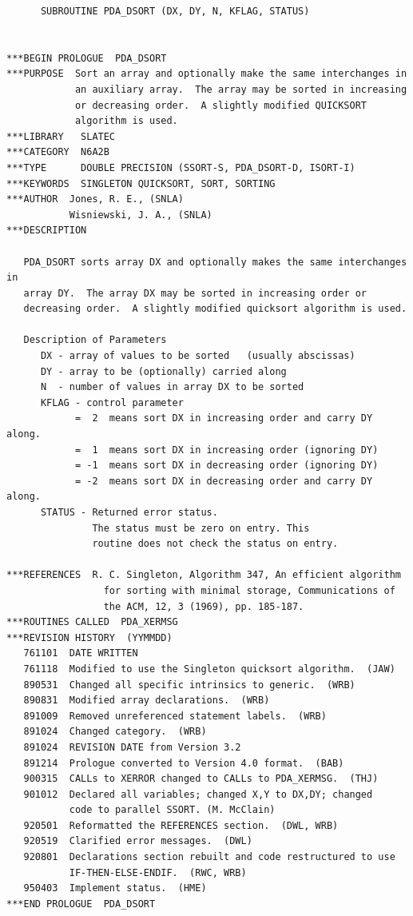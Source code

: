 \documentclass[11pt,twoside]{article}
\begin{document}
\begin{verbatim}
      SUBROUTINE PDA_DSORT (DX, DY, N, KFLAG, STATUS)


***BEGIN PROLOGUE  PDA_DSORT
***PURPOSE  Sort an array and optionally make the same interchanges in
            an auxiliary array.  The array may be sorted in increasing
            or decreasing order.  A slightly modified QUICKSORT
            algorithm is used.
***LIBRARY   SLATEC
***CATEGORY  N6A2B
***TYPE      DOUBLE PRECISION (SSORT-S, PDA_DSORT-D, ISORT-I)
***KEYWORDS  SINGLETON QUICKSORT, SORT, SORTING
***AUTHOR  Jones, R. E., (SNLA)
           Wisniewski, J. A., (SNLA)
***DESCRIPTION

   PDA_DSORT sorts array DX and optionally makes the same interchanges in
   array DY.  The array DX may be sorted in increasing order or
   decreasing order.  A slightly modified quicksort algorithm is used.

   Description of Parameters
      DX - array of values to be sorted   (usually abscissas)
      DY - array to be (optionally) carried along
      N  - number of values in array DX to be sorted
      KFLAG - control parameter
            =  2  means sort DX in increasing order and carry DY along.
            =  1  means sort DX in increasing order (ignoring DY)
            = -1  means sort DX in decreasing order (ignoring DY)
            = -2  means sort DX in decreasing order and carry DY along.
      STATUS - Returned error status.
               The status must be zero on entry. This
               routine does not check the status on entry.

***REFERENCES  R. C. Singleton, Algorithm 347, An efficient algorithm
                 for sorting with minimal storage, Communications of
                 the ACM, 12, 3 (1969), pp. 185-187.
***ROUTINES CALLED  PDA_XERMSG
***REVISION HISTORY  (YYMMDD)
   761101  DATE WRITTEN
   761118  Modified to use the Singleton quicksort algorithm.  (JAW)
   890531  Changed all specific intrinsics to generic.  (WRB)
   890831  Modified array declarations.  (WRB)
   891009  Removed unreferenced statement labels.  (WRB)
   891024  Changed category.  (WRB)
   891024  REVISION DATE from Version 3.2
   891214  Prologue converted to Version 4.0 format.  (BAB)
   900315  CALLs to XERROR changed to CALLs to PDA_XERMSG.  (THJ)
   901012  Declared all variables; changed X,Y to DX,DY; changed
           code to parallel SSORT. (M. McClain)
   920501  Reformatted the REFERENCES section.  (DWL, WRB)
   920519  Clarified error messages.  (DWL)
   920801  Declarations section rebuilt and code restructured to use
           IF-THEN-ELSE-ENDIF.  (RWC, WRB)
   950403  Implement status.  (HME)
***END PROLOGUE  PDA_DSORT
\end{verbatim}
\end{document}
